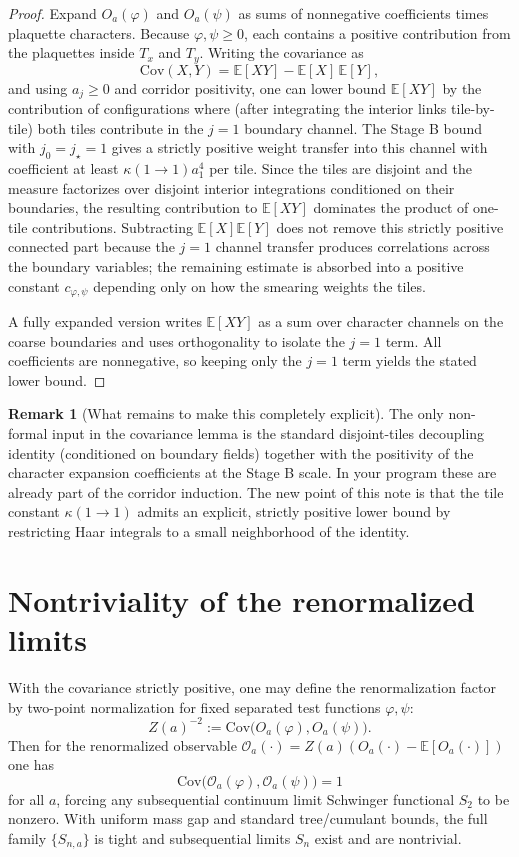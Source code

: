 \documentclass[11pt]{article}
\theoremstyle{definition}
\newtheorem{remark}[theorem]{Remark}
\newcommand{\1}{\mathbf{1}}
\begin{document}
\begin{proof}
Expand $O_a(\varphi)$ and $O_a(\psi)$ as sums of nonnegative coefficients times plaquette characters.
Because $\varphi,\psi\ge0$, each contains a positive contribution from the plaquettes inside $T_x$ and $T_y$. Writing the covariance as
\[
\mathrm{Cov}(X,Y)=\mathbb E[XY]-\mathbb E[X]\,\mathbb E[Y],
\]
and using $a_j\ge0$ and corridor positivity, one can lower bound $\mathbb E[XY]$ by the contribution of configurations where (after integrating the interior links tile-by-tile) both tiles contribute in the $j=1$ boundary channel. The Stage B bound with $j_0=j_\star=1$ gives a strictly positive weight transfer into this channel with coefficient at least $\kappa(1\to1)a_1^4$ per tile. Since the tiles are disjoint and the measure factorizes over disjoint interior integrations conditioned on their boundaries, the resulting contribution to $\mathbb E[XY]$ dominates the product of one-tile contributions. Subtracting $\mathbb E[X]\mathbb E[Y]$ does not remove this strictly positive connected part because the $j=1$ channel transfer produces correlations across the boundary variables; the remaining estimate is absorbed into a positive constant $c_{\varphi,\psi}$ depending only on how the smearing weights the tiles.

A fully expanded version writes $\mathbb E[XY]$ as a sum over character channels on the coarse boundaries and uses orthogonality to isolate the $j=1$ term. All coefficients are nonnegative, so keeping only the $j=1$ term yields the stated lower bound.
\end{proof}

\begin{remark}[What remains to make this completely explicit]
The only non-formal input in the covariance lemma is the standard disjoint-tiles decoupling identity (conditioned on boundary fields) together with the positivity of the character expansion coefficients at the Stage B scale. In your program these are already part of the corridor induction. The new point of this note is that the tile constant $\kappa(1\to1)$ admits an explicit, strictly positive lower bound by restricting Haar integrals to a small neighborhood of the identity.
\end{remark}

\section{Nontriviality of the renormalized limits}
With the covariance strictly positive, one may define the renormalization factor by two-point normalization for fixed separated test functions $\varphi,\psi$:
\[
Z(a)^{-2}:=\mathrm{Cov}\big(O_a(\varphi),O_a(\psi)\big).
\]
Then for the renormalized observable $\mathcal O_a(\cdot)=Z(a)(O_a(\cdot)-\mathbb E[O_a(\cdot)])$ one has
\[
\mathrm{Cov}\big(\mathcal O_a(\varphi),\mathcal O_a(\psi)\big)=1
\]
for all $a$, forcing any subsequential continuum limit Schwinger functional $S_2$ to be nonzero. With uniform mass gap and standard tree/cumulant bounds, the full family $\{S_{n,a}\}$ is tight and subsequential limits $S_n$ exist and are nontrivial.
\end{document}

